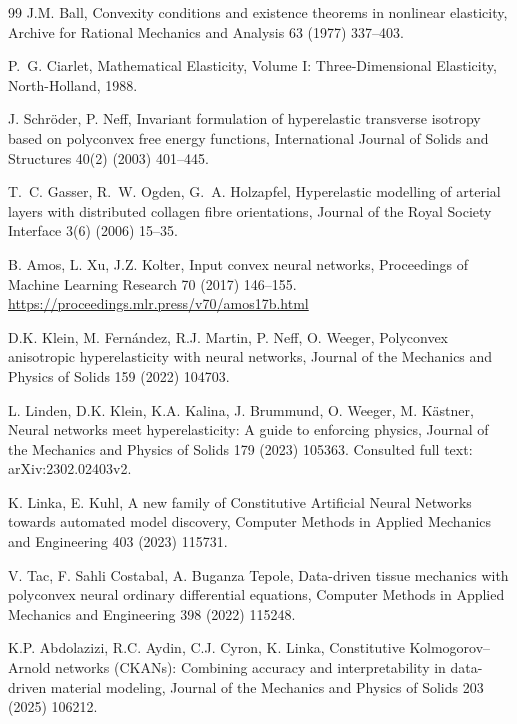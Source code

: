 \begin{thebibliography}{99}
J.M. Ball, Convexity conditions and existence theorems in nonlinear elasticity, Archive for Rational Mechanics and Analysis 63 (1977) 337--403.

P.~G. Ciarlet, Mathematical Elasticity, Volume I: Three-Dimensional
Elasticity, North-Holland, 1988.

J. Schr\"oder, P. Neff, Invariant formulation of hyperelastic
transverse isotropy based on polyconvex free energy functions,
International Journal of Solids and Structures 40(2) (2003) 401--445.

T.~C. Gasser, R.~W. Ogden, G.~A. Holzapfel, Hyperelastic modelling of
arterial layers with distributed collagen fibre orientations,
Journal of the Royal Society Interface 3(6) (2006) 15--35.

B. Amos, L. Xu, J.Z. Kolter, Input convex neural networks, Proceedings of Machine Learning Research 70 (2017) 146--155. \url{https://proceedings.mlr.press/v70/amos17b.html}

D.K. Klein, M. Fern\'andez, R.J. Martin, P. Neff, O. Weeger, Polyconvex anisotropic hyperelasticity with neural networks, Journal of the Mechanics and Physics of Solids 159 (2022) 104703. 

L. Linden, D.K. Klein, K.A. Kalina, J. Brummund, O. Weeger, M. K\"astner,
Neural networks meet hyperelasticity: A guide to enforcing physics,
Journal of the Mechanics and Physics of Solids 179 (2023) 105363.
Consulted full text: arXiv:2302.02403v2.

K. Linka, E. Kuhl, A new family of Constitutive Artificial Neural
Networks towards automated model discovery,
Computer Methods in Applied Mechanics and Engineering 403 (2023) 115731.

V. Tac, F. Sahli Costabal, A. Buganza Tepole, Data-driven tissue
mechanics with polyconvex neural ordinary differential equations,
Computer Methods in Applied Mechanics and Engineering 398 (2022) 115248.

K.P. Abdolazizi, R.C. Aydin, C.J. Cyron, K. Linka,
Constitutive Kolmogorov--Arnold networks (CKANs): Combining accuracy and interpretability in data-driven material modeling,
Journal of the Mechanics and Physics of Solids 203 (2025) 106212.


\end{thebibliography}

